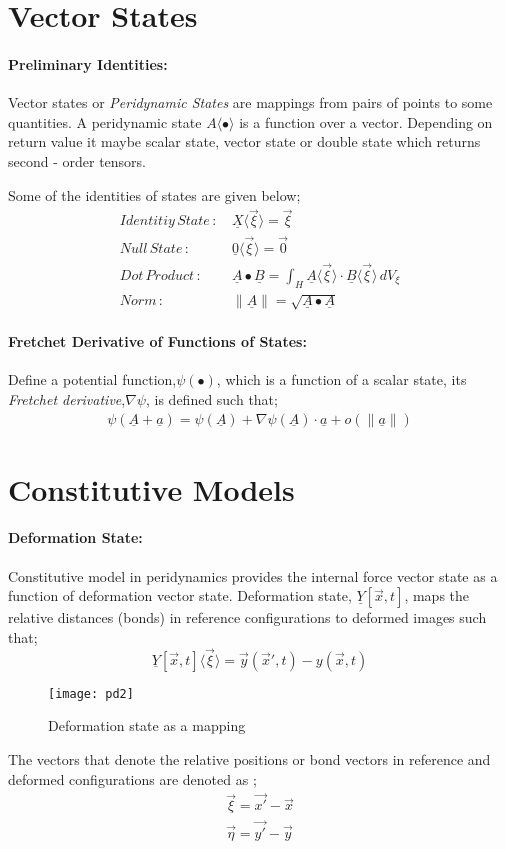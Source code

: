 \documentclass[10pt,a4paper,onecolumn]{article}
\def\State#1#2{$#1\langle#2\rangle$}
\begin{document}
\section{Vector States}
\paragraph{Preliminary Identities:}
Vector states or \textit{Peridynamic States} are mappings from pairs of points to some quantities.\cite{SILLING201073} A peridynamic state \State{A}{\bullet} is a function over a vector. Depending on return value it maybe scalar state, vector state or double state which returns second - order tensors. 

Some of the identities of states are given below; 
\begin{align}
Identitiy\,State\,:\,&\underline{X}\langle\vec{\xi}\rangle = \vec{\xi}\\
Null\,State\,:\,&\underline{0}\langle\vec{\xi}\rangle=\vec{0}\\
Dot\,Product\,:\,&\underline{A}\bullet\underline{B}=\int_{H}{\underline{A}\langle\vec{\xi}\rangle\cdot\underline{B}\langle\vec{\xi}\rangle}\,dV_\xi\\
Norm\,:\,&\|\underline{A}\|=\sqrt{\underline{A}\bullet\underline{A}}
\end{align}
\paragraph{Fretchet Derivative of Functions of States:}
Define a potential function,$\psi(\bullet)$, which is a function of a scalar state, its \textit{Fretchet derivative},$\nabla\psi$, is defined such that;\\
\begin{align}
\psi(\underline{A}+\underline{a})=\psi(\underline{A})+\nabla\psi(\underline{A})\cdot\underline{a}+o(\|\underline{a}\|)
\end{align}
\section{Constitutive Models}
\paragraph{Deformation State:}
Constitutive model in peridynamics provides the internal force vector state as a function of deformation vector state. Deformation state, $\underline{Y}[\vec{x},t]$, maps the relative distances (bonds) in reference configurations to deformed images such that;
\begin{equation}
\underline{Y}[\vec{x},t]\langle\vec{\xi}\rangle = \vec{y}(\vec{x}',t)-y(\vec{x},t)
\end{equation}
\begin{figure}[h]
\centering
\caption{Deformation state as a mapping}
\texttt{[image: pd2]}
\end{figure}
The vectors that denote the relative positions or bond vectors in reference and deformed configurations are denoted as ; 
\begin{align}
\vec{\xi} = \vec{x'}-\vec{x}\\
\vec{\eta} = \vec{y'}-\vec{y}
\end{align}
\end{document}
